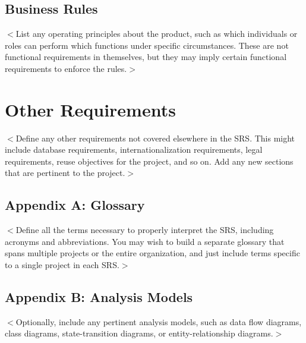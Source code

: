 \documentclass{scrreprt}
\begin{document}
\section{Business Rules}
$<$List any operating principles about the product, such as which individuals or 
roles can perform which functions under specific circumstances. These are not 
functional requirements in themselves, but they may imply certain functional 
requirements to enforce the rules.$>$


\chapter{Other Requirements}
$<$Define any other requirements not covered elsewhere in the SRS. This might 
include database requirements, internationalization requirements, legal 
requirements, reuse objectives for the project, and so on. Add any new sections 
that are pertinent to the project.$>$

\section{Appendix A: Glossary}
$<$Define all the terms necessary to properly interpret the SRS, including 
acronyms and abbreviations. You may wish to build a separate glossary that spans 
multiple projects or the entire organization, and just include terms specific to 
a single project in each SRS.$>$

\section{Appendix B: Analysis Models}
$<$Optionally, include any pertinent analysis models, such as data flow 
diagrams, class diagrams, state-transition diagrams, or entity-relationship 
diagrams.$>$
\end{document}
